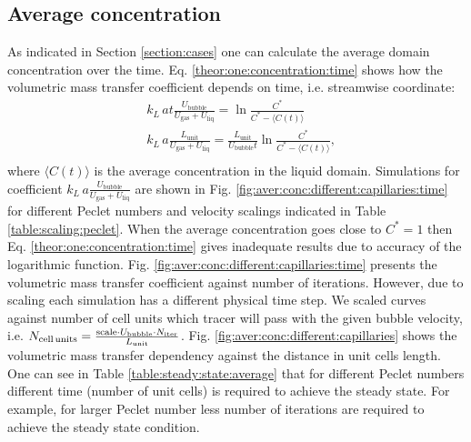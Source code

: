 \documentclass{article}
\newcommand{\beqal}{\begin{equation}\begin{aligned}}
\newcommand{\feqal}{\end{aligned}\end{equation}}
\newcommand{\vol}{k_L\,a}
\newcommand{\lunit}{L_{\mathrm{unit}}}
\newcommand{\ububble}{U_{\mathrm{bubble}}}
\newcommand{\uliq}{U_{\mathrm{liq}}}
\newcommand{\ugas}{U_{\mathrm{gas}}}
\newcommand{\cstar}{C^{*}}
\begin{document}
\subsection{Average concentration}
\label{main:results:periodic}
As indicated in Section \ref{section:cases} one can calculate the average domain concentration over
the time. Eq. \ref{theor:one:concentration:time} shows how 
the volumetric mass transfer coefficient depends on
time, i.e. streamwise coordinate:
\beqal
&\vol t \frac{\ububble}{\ugas+\uliq}=\ln\frac{\cstar}{\cstar-\langle C(t) \rangle}\\
&\vol \frac{\lunit}{\ugas+\uliq}=\frac{\lunit}{\ububble t} \ln \frac{C^*}{C^*-\langle C(t)
\rangle},\\
\feqal
where $\langle C(t) \rangle$ is the average concentration in the liquid domain.
Simulations for coefficient $\vol \frac{\ububble}{\ugas+\uliq}$ are shown in Fig.
\ref{fig:aver:conc:different:capillaries:time} for different Peclet numbers and velocity scalings
indicated in Table \ref{table:scaling:peclet}. When the average concentration goes
close to $\cstar=1$ then Eq. \ref{theor:one:concentration:time} gives inadequate results due to
 accuracy of the logarithmic function. Fig. \ref{fig:aver:conc:different:capillaries:time} presents
the volumetric mass transfer coefficient against number of iterations. However, due to scaling
each simulation has a different physical time step. We scaled curves against number of cell
units which tracer will pass with the given bubble velocity, i.e. 
$N_{\text{cell\,units}}=\frac{\text{scale}\cdot \ububble\cdot N_{\mathrm{iter}}}{\lunit}$.  Fig.
\ref{fig:aver:conc:different:capillaries} shows the volumetric mass transfer
dependency against the distance in unit cells length. One can see in Table
\ref{table:steady:state:average} that for different Peclet numbers different time (number of unit
cells) is required to achieve the steady state. For example, for
larger Peclet number less number of iterations are required to achieve the steady state condition. 
\end{document}
